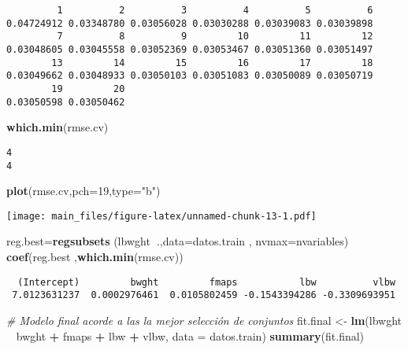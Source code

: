\documentclass[]{article}
\newenvironment{Shaded}{\begin{snugshade}}{\end{snugshade}}
\newcommand{\KeywordTok}[1]{\textcolor[rgb]{0.13,0.29,0.53}{\textbf{#1}}}
\newcommand{\DataTypeTok}[1]{\textcolor[rgb]{0.13,0.29,0.53}{#1}}
\newcommand{\DecValTok}[1]{\textcolor[rgb]{0.00,0.00,0.81}{#1}}
\newcommand{\StringTok}[1]{\textcolor[rgb]{0.31,0.60,0.02}{#1}}
\newcommand{\CommentTok}[1]{\textcolor[rgb]{0.56,0.35,0.01}{\textit{#1}}}
\newcommand{\OperatorTok}[1]{\textcolor[rgb]{0.81,0.36,0.00}{\textbf{#1}}}
\newcommand{\NormalTok}[1]{#1}
\begin{document}
\begin{verbatim}
         1          2          3          4          5          6 
0.04724912 0.03348780 0.03056028 0.03030288 0.03039083 0.03039898 
         7          8          9         10         11         12 
0.03048605 0.03045558 0.03052369 0.03053467 0.03051360 0.03051497 
        13         14         15         16         17         18 
0.03049662 0.03048933 0.03050103 0.03051083 0.03050089 0.03050719 
        19         20 
0.03050598 0.03050462 
\end{verbatim}

\begin{Shaded}
\begin{Highlighting}[]
\KeywordTok{which.min}\NormalTok{(rmse.cv)}
\end{Highlighting}
\end{Shaded}

\begin{verbatim}
4 
4 
\end{verbatim}

\begin{Shaded}
\begin{Highlighting}[]
\KeywordTok{plot}\NormalTok{(rmse.cv,}\DataTypeTok{pch=}\DecValTok{19}\NormalTok{,}\DataTypeTok{type=}\StringTok{"b"}\NormalTok{)}
\end{Highlighting}
\end{Shaded}

\texttt{[image: main\_files/figure-latex/unnamed-chunk-13-1.pdf]}

\begin{Shaded}
\begin{Highlighting}[]
\NormalTok{reg.best=}\KeywordTok{regsubsets}\NormalTok{ (lbwght}\OperatorTok{~}\NormalTok{.,}\DataTypeTok{data=}\NormalTok{datos.train , }\DataTypeTok{nvmax=}\NormalTok{nvariables)}
\KeywordTok{coef}\NormalTok{(reg.best ,}\KeywordTok{which.min}\NormalTok{(rmse.cv))}
\end{Highlighting}
\end{Shaded}

\begin{verbatim}
  (Intercept)         bwght         fmaps           lbw          vlbw 
 7.0123631237  0.0002976461  0.0105802459 -0.1543394286 -0.3309693951 
\end{verbatim}

\begin{Shaded}
\begin{Highlighting}[]
\CommentTok{# Modelo final acorde a las la mejor selección de conjuntos}
\NormalTok{fit.final <-}\StringTok{ }\KeywordTok{lm}\NormalTok{(lbwght }\OperatorTok{~}\StringTok{ }\NormalTok{bwght }\OperatorTok{+}\StringTok{ }\NormalTok{fmaps }\OperatorTok{+}\StringTok{ }\NormalTok{lbw }\OperatorTok{+}\StringTok{ }\NormalTok{vlbw, }\DataTypeTok{data =}\NormalTok{ datos.train)}
\KeywordTok{summary}\NormalTok{(fit.final)}
\end{Highlighting}
\end{Shaded}
\end{document}
